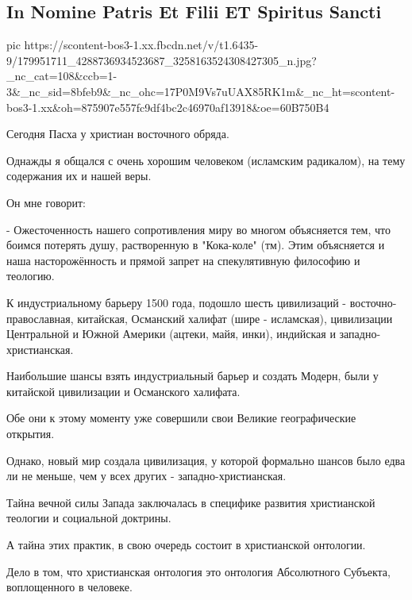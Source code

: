  
 
 
 
 
\subsection{In Nomine Patris Et Filii ET Spiritus Sancti}

\ifcmt
  pic https://scontent-bos3-1.xx.fbcdn.net/v/t1.6435-9/179951711_4288736934523687_3258163524308427305_n.jpg?_nc_cat=108&ccb=1-3&_nc_sid=8bfeb9&_nc_ohc=17P0M9Vs7uUAX85RK1m&_nc_ht=scontent-bos3-1.xx&oh=875907e557fc9df4bc2c46970af13918&oe=60B750B4
\fi

Сегодня Пасха у христиан восточного обряда. 

Однажды я общался с очень хорошим человеком (исламским радикалом), на тему содержания их и нашей веры.

Он мне говорит:

- Ожесточенность нашего сопротивления миру во многом объясняется тем, что
боимся потерять душу, растворенную в "Кока-коле" (тм).  Этим объясняется и наша
насторожённость и прямой запрет на спекулятивную философию и теологию.

К индустриальному барьеру 1500 года, подошло шесть цивилизаций -
восточно-православная, китайская, Османский халифат (шире - исламская),
цивилизации Центральной и Южной Америки (ацтеки, майя, инки), индийская и
западно-христианская. 

Наибольшие шансы взять индустриальный барьер и создать Модерн, были у китайской
цивилизации и Османского халифата.

Обе они к этому моменту уже совершили свои Великие географические открытия.

Однако, новый мир создала цивилизация, у которой формально шансов было едва ли
не меньше, чем у всех других - западно-христианская.

Тайна вечной силы Запада заключалась в специфике развития христианской теологии
и социальной доктрины. 

А тайна этих практик, в свою очередь состоит в христианской онтологии.

Дело в том, что христианская онтология это онтология Абсолютного Субъекта,
воплощенного в человеке.

